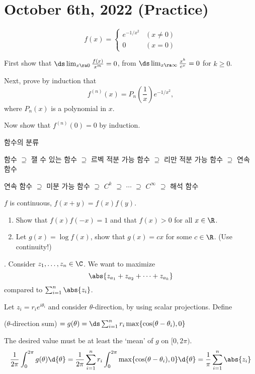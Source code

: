 \section*{October 6th, 2022 (Practice)}

\[
    f(x) = \begin{cases}
        e^{-1/x^2} & (x \neq 0) \\ 0 & (x = 0)
    \end{cases}
\]

First show that \(\ds \lim_{x \ra 0} \frac{f(x)}{x^m} = 0\), from \(\ds \lim_{x \ra \infty} \frac{x^k}{e^x} = 0\) for \(k \geq 0\).

Next, prove by induction that
\[
    f^{(n)}(x) = P_n\left(\frac{1}{x}\right)e^{-1/x^2},
\]
where \(P_n(x)\) is a polynomial in \(x\).

Now show that \(f^{(n)}(0) = 0\) by induction.

\rmk 함수의 분류
\begin{center}
    함수 \(\supseteq\) 잴 수 있는 함수 \(\supseteq\) 르벡 적분 가능 함수 \(\supseteq\) 리만 적분 가능 함수 \(\supseteq\) 연속 함수
\end{center}

\begin{center}
    연속 함수 \(\supseteq\) 미분 가능 함수 \(\supseteq\) \(C^k\) \(\supseteq\) \(\cdots\) \(\supseteq\) \(C^\infty\) \(\supseteq\) 해석 함수
\end{center}

 \(f\) is continuous, \(f(x + y) = f(x)f(y)\).
\begin{enumerate}
    \item Show that \(f(x)f(-x) = 1\) and that \(f(x) > 0\) for all \(x \in \R\).
    \item Let \(g(x) = \log f(x)\), show that \(g(x) = cx\) for some \(c \in \R\). (Use continuity!)
\end{enumerate}

\prob. Consider \(z_1, \dots, z_n \in \C\). We want to maximize
\[
    \abs{z_{a_1} + z_{a_2} + \cdots + z_{a_k}}
\]
compared to \(\sum_{i=1}^n \abs{z_i}\).

\pf Let \(z_i = r_i e^{i\theta_i}\) and consider \(\theta\)-direction, by using scalar projections. Define
\begin{center}
    (\(\theta\)-direction sum) \(= g(\theta) = \ds \sum_{i=1}^n r_i \max\{\cos (\theta - \theta_i), 0\}\)
\end{center}
The desired value must be at least the `mean' of \(g\) on \([0, 2\pi)\).
\[
    \frac{1}{2\pi}\int_0^{2\pi} g(\theta) \d{\theta} = \frac{1}{2\pi}\sum_{i=1}^n r_i \int_0^{2\pi} \max\{\cos(\theta - \theta_i), 0\} \d{\theta} = \frac{1}{\pi} \sum_{i=1}^n \abs{z_i}
\]

